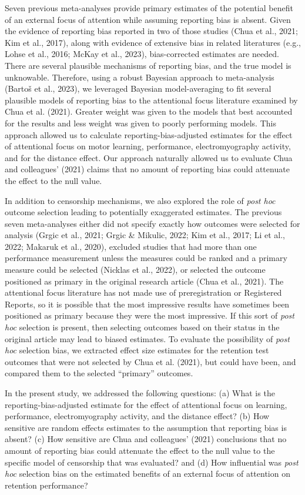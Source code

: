 \documentclass[
  man, donotrepeattitle,floatsintext]{apa7}
\begin{document}
Seven previous meta-analyses provide primary estimates of the potential benefit of an external focus of attention while assuming reporting bias is absent. Given the evidence of reporting bias reported in two of those studies (Chua et al., 2021; Kim et al., 2017), along with evidence of extensive bias in related literatures (e.g., Lohse et al., 2016; McKay et al., 2023), bias-corrected estimates are needed. There are several plausible mechanisms of reporting bias, and the true model is unknowable. Therefore, using a robust Bayesian approach to meta-analysis (Bartoš et al., 2023), we leveraged Bayesian model-averaging to fit several plausible models of reporting bias to the attentional focus literature examined by Chua et al. (2021). Greater weight was given to the models that best accounted for the results and less weight was given to poorly performing models. This approach allowed us to calculate reporting-bias-adjusted estimates for the effect of attentional focus on motor learning, performance, electromyography activity, and for the distance effect. Our approach naturally allowed us to evaluate Chua and colleagues' (2021) claims that no amount of reporting bias could attenuate the effect to the null value.

In addition to censorship mechanisms, we also explored the role of \emph{post hoc} outcome selection leading to potentially exaggerated estimates. The previous seven meta-analyses either did not specify exactly how outcomes were selected for analysis (Grgic et al., 2021; Grgic \& Mikulic, 2022; Kim et al., 2017; Li et al., 2022; Makaruk et al., 2020), excluded studies that had more than one performance measurement unless the measures could be ranked and a primary measure could be selected (Nicklas et al., 2022), or selected the outcome positioned as primary in the original research article (Chua et al., 2021). The attentional focus literature has not made use of preregistration or Registered Reports, so it is possible that the most impressive results have sometimes been positioned as primary because they were the most impressive. If this sort of \emph{post hoc} selection is present, then selecting outcomes based on their status in the original article may lead to biased estimates. To evaluate the possibility of \emph{post hoc} selection bias, we extracted effect size estimates for the retention test outcomes that were not selected by Chua et al. (2021), but could have been, and compared them to the selected ``primary'' outcomes.

In the present study, we addressed the following questions: (a) What is the reporting-bias-adjusted estimate for the effect of attentional focus on learning, performance, electromyography activity, and the distance effect? (b) How sensitive are random effects estimates to the assumption that reporting bias is absent? (c) How sensitive are Chua and colleagues' (2021) conclusions that no amount of reporting bias could attenuate the effect to the null value to the specific model of censorship that was evaluated? and (d) How influential was \emph{post hoc} selection bias on the estimated benefits of an external focus of attention on retention performance?
\end{document}
